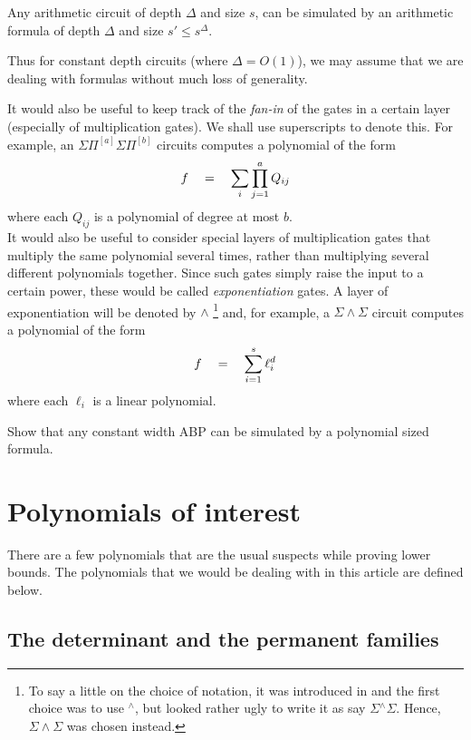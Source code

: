 \begin{fact}
Any arithmetic circuit of depth $\Delta$ and size $s$, can be simulated by an arithmetic formula of depth $\Delta$ and size $s' \leq s^{\Delta}$. 
\end{fact}

Thus for constant depth circuits (where $\Delta = O(1)$), we may assume that we are dealing with formulas without much loss of generality.


It would also be useful to keep track of the \emph{fan-in} of the gates in a certain layer (especially of multiplication gates). We shall use superscripts to denote this. For example, an $\Sigma\Pi^{[a]}\Sigma\Pi^{[b]}$ circuits computes a polynomial of the form
\[
f \quad = \quad \sum_i \prod_{j=1}^a Q_{ij}
\]
where each $Q_{ij}$ is a polynomial of degree at most $b$. \\

It would also be useful to consider special layers of multiplication gates that multiply the same polynomial several times, rather than multiplying several different polynomials together. Since such gates simply raise the input to a certain power, these would be called \emph{exponentiation} gates. A layer of exponentiation will be denoted by $\wedge$ \footnote{To say a little on the choice of notation, it was introduced in \cite{gkks13b} and the first choice was to use ${}^{\wedge}$, but looked rather ugly to write it as say $\Sigma{}^{\wedge}\Sigma$. Hence, $\Sigma\!\wedge\!\Sigma$  was chosen instead. } and, for example, a $\Sigma\!\wedge\!\Sigma$ circuit computes a polynomial of the form 
\[
f\quad = \quad \sum_{i=1}^s \ell_{i}^d
\]
where each $\ell_i$ is a linear polynomial. \\

\begin{exercise}
Show that any constant width ABP can be simulated by a polynomial sized formula. 
\end{exercise}



\section{Polynomials of interest}

There are a few polynomials that are the usual suspects while proving lower bounds. The polynomials that we would be dealing with in this article are defined below. 

\subsection*{The determinant and the permanent families}

